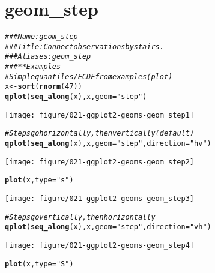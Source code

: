 \documentclass[a4paper,titlepage]{tufte-handout}\usepackage[]{graphicx}\usepackage[]{color}
\makeatletter
\def\maxwidth{ %
  \ifdim\Gin@nat@width>\linewidth
    \linewidth
  \else
    \Gin@nat@width
  \fi
}
\newcommand{\hlnum}[1]{\textcolor[rgb]{0.686,0.059,0.569}{#1}}%
\newcommand{\hlstr}[1]{\textcolor[rgb]{0.192,0.494,0.8}{#1}}%
\newcommand{\hlcom}[1]{\textcolor[rgb]{0.678,0.584,0.686}{\textit{#1}}}%
\newcommand{\hlstd}[1]{\textcolor[rgb]{0.345,0.345,0.345}{#1}}%
\newcommand{\hlkwb}[1]{\textcolor[rgb]{0.69,0.353,0.396}{#1}}%
\newcommand{\hlkwc}[1]{\textcolor[rgb]{0.333,0.667,0.333}{#1}}%
\newcommand{\hlkwd}[1]{\textcolor[rgb]{0.737,0.353,0.396}{\textbf{#1}}}%
\newenvironment{kframe}{%
 \def\at@end@of@kframe{}%
 \ifinner\ifhmode%
  \def\at@end@of@kframe{\end{minipage}}%
  \begin{minipage}{\columnwidth}%
 \fi\fi%
 \def\FrameCommand##1{\hskip\@totalleftmargin \hskip-\fboxsep
 \colorbox{shadecolor}{##1}\hskip-\fboxsep
     \hskip-\linewidth \hskip-\@totalleftmargin \hskip\columnwidth}%
 \MakeFramed {\advance\hsize-\width
   \@totalleftmargin\z@ \linewidth\hsize
   \@setminipage}}%
 {\par\unskip\endMakeFramed%
 \at@end@of@kframe}
\newenvironment{knitrout}{}{} %
\makeatother
\begin{document}
\section{geom\_step}

\begin{knitrout}
\color{fgcolor}\begin{kframe}
\begin{alltt}
\hlcom{### Name: geom_step}
\hlcom{### Title: Connect observations by stairs.}
\hlcom{### Aliases: geom_step}
\hlcom{### ** Examples}
\hlcom{# Simple quantiles/ECDF from examples(plot)}
\hlstd{x} \hlkwb{<-} \hlkwd{sort}\hlstd{(}\hlkwd{rnorm}\hlstd{(}\hlnum{47}\hlstd{))}
\hlkwd{qplot}\hlstd{(}\hlkwd{seq_along}\hlstd{(x), x,} \hlkwc{geom}\hlstd{=}\hlstr{"step"}\hlstd{)}
\end{alltt}
\end{kframe}
\texttt{[image: figure/021-ggplot2-geoms-geom\_step1]} 
\begin{kframe}\begin{alltt}
\hlcom{# Steps go horizontally, then vertically (default)}
\hlkwd{qplot}\hlstd{(}\hlkwd{seq_along}\hlstd{(x), x,} \hlkwc{geom}\hlstd{=}\hlstr{"step"}\hlstd{,} \hlkwc{direction} \hlstd{=} \hlstr{"hv"}\hlstd{)}
\end{alltt}
\end{kframe}
\texttt{[image: figure/021-ggplot2-geoms-geom\_step2]} 
\begin{kframe}\begin{alltt}
\hlkwd{plot}\hlstd{(x,} \hlkwc{type} \hlstd{=} \hlstr{"s"}\hlstd{)}
\end{alltt}
\end{kframe}
\texttt{[image: figure/021-ggplot2-geoms-geom\_step3]} 
\begin{kframe}\begin{alltt}
\hlcom{# Steps go vertically, then horizontally}
\hlkwd{qplot}\hlstd{(}\hlkwd{seq_along}\hlstd{(x), x,} \hlkwc{geom}\hlstd{=}\hlstr{"step"}\hlstd{,} \hlkwc{direction} \hlstd{=} \hlstr{"vh"}\hlstd{)}
\end{alltt}
\end{kframe}
\texttt{[image: figure/021-ggplot2-geoms-geom\_step4]} 
\begin{kframe}\begin{alltt}
\hlkwd{plot}\hlstd{(x,} \hlkwc{type} \hlstd{=} \hlstr{"S"}\hlstd{)}
\end{alltt}
\end{kframe}

\end{knitrout}
\end{document}
